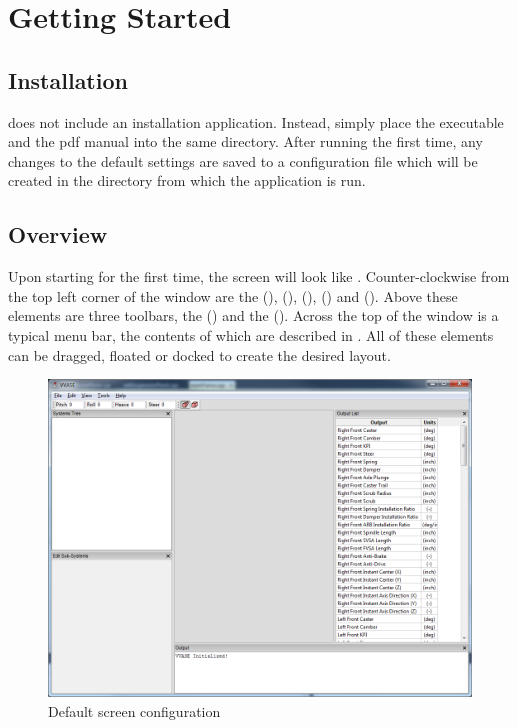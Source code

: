 \chapter{Getting Started} \label{ch:gettingStarted}

\section{Installation} \label{sec:installation}

\vvase{} does not include an installation application.  Instead, simply place the executable and the pdf manual into the same directory.  After running the first time, any changes to the default settings are saved to a configuration file which will be created in the directory from which the application is run.

\section{Overview} \label{sec:overview}

Upon starting \vvase{} for the first time, the screen will look like .  Counter-clockwise from the top left corner of the window are the  (),  (),  (),  () and  ().  Above these elements are three toolbars, the  () and the  ().  Across the top of the window is a typical menu bar, the contents of which are described in .  All of these elements can be dragged, floated or docked to create the desired layout.

\begin{figure}
  \includegraphics[width=\textwidth]{images/defaultStartup}
  \caption{Default screen configuration} \label{fig:defaultStartup}
  \centering
\end{figure}

